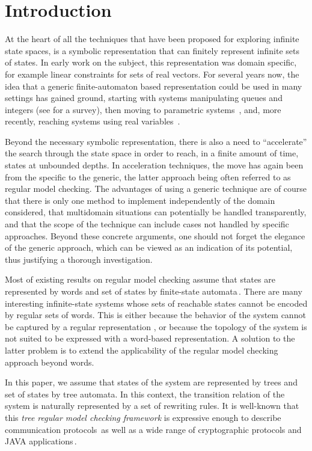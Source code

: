 
\section{Introduction}
\label{sec:introduction}

At the heart of all the techniques that have been proposed for
exploring infinite state spaces, is a symbolic representation that can
finitely represent infinite sets of states. In early work on the
subject, this representation was domain specific, for example linear
constraints for sets of real vectors. For several years now, the idea
that a generic finite-automaton based representation could be used in
many settings has gained ground, starting with systems manipulating
queues and integers (see \cite{WB98} for a survey), then moving to
parametric systems~\cite{KMMPS97}, and, more recently, reaching systems
using real variables~\cite{BJW01}.

Beyond the necessary symbolic representation, there is also a need to
``accelerate'' the search through the state space in order to reach,
in a finite amount of time, states at unbounded depths. In
acceleration techniques, the move has again been from the specific to
the generic, the latter approach being often referred to as regular
model checking.  The advantages of using a generic technique are of
course that there is only one method to implement independently of the
domain considered, that multidomain situations can potentially be
handled transparently, and that the scope of the technique can include
cases not handled by specific approaches. Beyond these concrete
arguments, one should not forget the elegance of the generic approach,
which can be viewed as an indication of its potential, thus justifying
a thorough investigation.

Most of existing results on regular model checking assume that states
are represented by words and set of states by finite-state
automata\,\cite{BLW03,BJNT00}. There are many interesting
infinite-state systems whose sets of reachable states cannot be
encoded by regular sets of words. This is either because the behavior
of the system cannot be captured by a regular representation
\cite{FP01}, or because the topology of the system is not suited to be
expressed with a word-based representation. A solution to the latter
problem is to extend the applicability of the regular model checking
approach beyond words.

In this paper, we assume that states of the system are represented by
trees and set of states by tree automata. In this context, the
transition relation of the system is naturally represented by a set of
rewriting rules. It is well-known that this {\em tree regular model
  checking framework} is expressive enough to describe communication
protocols\,\cite{} as well as a wide range of cryptographic protocols
and JAVA applications\,\cite{}.

